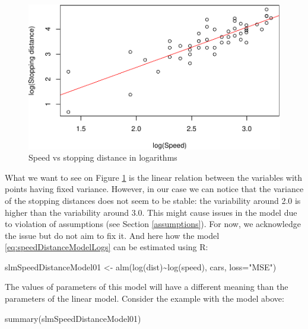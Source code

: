 \documentclass[
]{book}
\newenvironment{Shaded}{\begin{snugshade}}{\end{snugshade}}
\newcommand{\AttributeTok}[1]{\textcolor[rgb]{0.77,0.63,0.00}{#1}}
\newcommand{\FunctionTok}[1]{\textcolor[rgb]{0.00,0.00,0.00}{#1}}
\newcommand{\NormalTok}[1]{#1}
\newcommand{\OtherTok}[1]{\textcolor[rgb]{0.56,0.35,0.01}{#1}}
\newcommand{\SpecialCharTok}[1]{\textcolor[rgb]{0.00,0.00,0.00}{#1}}
\newcommand{\StringTok}[1]{\textcolor[rgb]{0.31,0.60,0.02}{#1}}
\theoremstyle{definition}
\theoremstyle{definition}
\theoremstyle{definition}
\theoremstyle{definition}
\theoremstyle{remark}
\begin{document}
\begin{figure}
\centering
\includegraphics{Svetunkov---Statistics-for-Business-Analytics_files/figure-latex/speedDistanceLogs-1.pdf}
\caption{\label{fig:speedDistanceLogs}Speed vs stopping distance in logarithms}
\end{figure}

What we want to see on Figure \ref{fig:speedDistanceLogs} is the linear relation between the variables with points having fixed variance. However, in our case we can notice that the variance of the stopping distances does not seem to be stable: the variability around 2.0 is higher than the variability around 3.0. This might cause issues in the model due to violation of assumptions (see Section \ref{assumptions}). For now, we acknowledge the issue but do not aim to fix it. And here how the model \eqref{eq:speedDistanceModelLogs} can be estimated using R:

\begin{Shaded}
\begin{Highlighting}[]
\NormalTok{slmSpeedDistanceModel01 }\OtherTok{\textless{}{-}} \FunctionTok{alm}\NormalTok{(}\FunctionTok{log}\NormalTok{(dist)}\SpecialCharTok{\textasciitilde{}}\FunctionTok{log}\NormalTok{(speed), cars, }\AttributeTok{loss=}\StringTok{"MSE"}\NormalTok{)}
\end{Highlighting}
\end{Shaded}

The values of parameters of this model will have a different meaning than the parameters of the linear model. Consider the example with the model above:

\begin{Shaded}
\begin{Highlighting}[]
\FunctionTok{summary}\NormalTok{(slmSpeedDistanceModel01)}
\end{Highlighting}
\end{Shaded}
\end{document}

